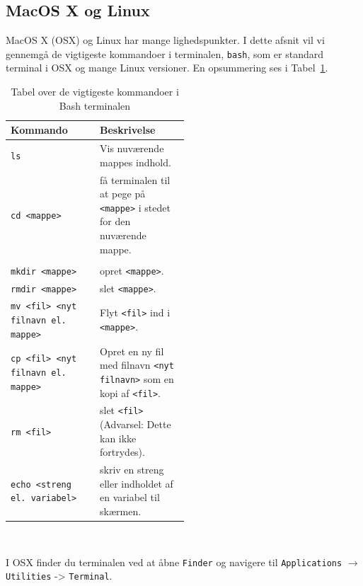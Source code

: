 \documentclass[a4paper]{article}
\begin{document}
\subsection{MacOS X og Linux}
MacOS X (OSX) og Linux har mange lighedspunkter. I dette afsnit vil vi gennemgå de vigtigeste kommandoer i terminalen, \verb|bash|, som er standard terminal i OSX og mange Linux versioner. En opsummering ses i Tabel~\ref{tab:bashKommandoer}.
\begin{table}
  \centering
  \begin{tabular}{|l||p{0.5\linewidth}|}
    \hline
    Kommando & Beskrivelse 
    \\ \hline\hline
    \verb|ls| 
             & Vis nuværende mappes indhold. 
    \\ \hline
    \verb|cd <mappe>| 
             & få terminalen til at pege på \verb|<mappe>| i stedet for den nuværende mappe. 
    \\ \hline
    \\ \hline
    \verb|mkdir <mappe>| 
             & opret \verb|<mappe>|. \\ \hline
    \verb|rmdir <mappe>|
             & slet \verb|<mappe>|. \\ \hline
    \verb|mv <fil> <nyt filnavn el. mappe>|
             & Flyt \verb|<fil>| ind i \verb|<mappe>|. \\ \hline
    \verb|cp <fil> <nyt filnavn el. mappe>|
             & Opret en ny fil med filnavn \verb|<nyt filnavn>| som en kopi af \verb|<fil>|. \\ \hline
    \verb|rm <fil>|
             & slet \verb|<fil>| (Advarsel: Dette kan ikke fortrydes). \\ \hline
    \verb|echo <streng el. variabel>|
             & skriv en streng eller indholdet af en variabel til skærmen. \\ \hline
  \end{tabular}\\
  \caption{Tabel over de vigtigeste kommandoer i Bash terminalen}
  \label{tab:bashKommandoer}
\end{table}

I OSX finder du terminalen ved at åbne \verb|Finder| og navigere til \verb|Applications| $\rightarrow$ \verb|Utilities| -> \verb|Terminal|. 
\end{document}
